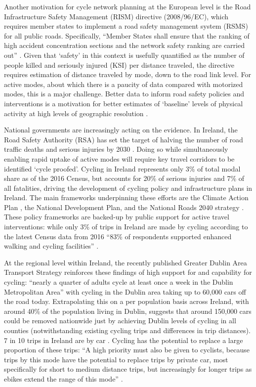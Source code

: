 \documentclass[
  super,
  preprint,
  3p]{elsarticle}
\begin{document}
Another motivation for cycle network planning at the European level is
the Road Infrastructure Safety Management (RISM) directive (2008/96/EC),
which requires member states to implement a road safety management
system (RSMS) for all public roads. Specifically, ``Member States shall
ensure that the ranking of high accident concentration sections and the
network safety ranking are carried out'' \citep{directiv2008}. Given
that `safety' in this context is usefully quantified as the number of
people killed and seriously injured (KSI) per distance traveled, the
directive requires estimation of distance traveled by mode, down to the
road link level. For active modes, about which there is a paucity of
data compared with motorized modes, this is a major challenge. Better
data to inform road safety policies and interventions is a motivation
for better estimates of `baseline' levels of physical activity at high
levels of geographic resolution \citep{tait2023}.

National governments are increasingly acting on the evidence. In
Ireland, the Road Safety Authority (RSA) has set the target of halving
the number of road traffic deaths and serious injuries by 2030
\citep{national2021}. Doing so while simultaneously enabling rapid
uptake of active modes will require key travel corridors to be
identified `cycle proofed'. Cycling in Ireland represents only 3\% of
total modal share as of the 2016 Census, but accounts for 20\% of
serious injuries and 7\% of all fatalities, driving the development of
cycling policy and infrastructure plans in Ireland. The main frameworks
underpinning these efforts are the Climate Action Plan
\citep{climate2022a}, the National Development Plan, and the National
Roads 2040 strategy \citep{national2023}. These policy frameworks are
backed-up by public support for active travel interventions: while only
3\% of trips in Ireland are made by cycling according to the latest
Census data from 2016 ``83\% of respondents supported enhanced walking
and cycling facilities'' \citep{sustaina2019}.

At the regional level within Ireland, the recently published Greater
Dublin Area Transport Strategy \citep{greater} reinforces these findings
of high support for and capability for cycling: ``nearly a quarter of
adults cycle at least once a week in the Dublin Metropolitan Area'' with
cycling in the Dublin area taking up to 60,000 cars off the road today.
Extrapolating this on a per population basis across Ireland, with around
40\% of the population living in Dublin, suggests that around 150,000
cars could be removed nationwide just by achieving Dublin levels of
cycling in all counties (notwithstanding existing cycling trips and
differences in trip distances). 7 in 10 trips in Ireland are by car
\citep{national} . Cycling has the potential to replace a large
proportion of these trips: ``A high priority must also be given to
cyclists, because trips by this mode have the potential to replace trips
by private car, most specifically for short to medium distance trips,
but increasingly for longer trips as ebikes extend the range of this
mode'' \citep{greater}.
\end{document}
